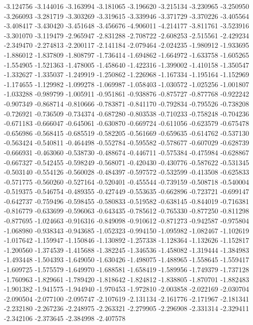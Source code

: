 -3.124756
-3.144016
-3.163994
-3.181065
-3.196620
-3.215134
-3.230965
-3.250950
-3.266093
-3.281719
-3.303269
-3.319615
-3.339946
-3.371729
-3.370226
-3.405564
-3.408417
-3.430420
-3.451648
-3.456676
-4.906011
-4.214177
-3.811761
-3.523916
-3.301070
-3.119479
-2.965947
-2.831288
-2.708722
-2.608253
-2.515561
-2.429234
-2.349470
-2.274813
-2.200117
-2.141184
-2.079464
-2.024235
-1.980912
-1.933695
-1.886012
-1.837809
-1.808797
-1.736414
-1.694862
-1.664972
-1.633758
-1.605265
-1.554905
-1.521363
-1.478005
-1.458640
-1.422316
-1.399002
-1.410158
-1.350547
-1.332627
-1.335037
-1.249919
-1.250862
-1.226968
-1.167334
-1.195164
-1.152969
-1.174655
-1.129982
-1.099278
-1.069987
-1.058403
-1.030572
-1.025256
-1.001807
-1.033288
-0.989799
-1.005911
-0.951861
-0.938876
-0.875727
-0.877768
-0.922242
-0.907349
-0.868714
-0.810666
-0.783871
-0.841170
-0.792834
-0.795526
-0.738208
-0.726921
-0.736509
-0.734374
-0.687280
-0.803538
-0.710233
-0.758248
-0.704236
-0.671183
-0.666047
-0.645061
-0.630870
-0.669724
-0.611056
-0.623579
-0.675478
-0.656986
-0.568415
-0.685519
-0.582205
-0.561669
-0.659635
-0.614762
-0.537130
-0.563424
-0.540811
-0.464498
-0.552784
-0.595582
-0.578677
-0.607029
-0.628739
-0.666931
-0.463060
-0.538730
-0.488674
-0.446711
-0.575384
-0.475984
-0.628867
-0.667327
-0.542455
-0.598249
-0.568071
-0.420430
-0.430776
-0.587622
-0.531345
-0.503140
-0.554126
-0.560028
-0.484397
-0.597572
-0.532599
-0.413508
-0.625833
-0.571775
-0.560260
-0.527164
-0.520401
-0.455544
-0.739159
-0.508718
-0.540004
-0.519375
-0.546754
-0.489355
-0.427449
-0.553635
-0.662896
-0.723721
-0.699147
-0.642737
-0.759496
-0.598455
-0.580833
-0.519582
-0.638145
-0.844019
-0.716381
-0.816779
-0.633699
-0.596063
-0.643435
-0.785612
-0.765330
-0.877250
-0.811298
-0.877695
-1.024663
-0.916316
-0.849098
-0.910612
-0.871273
-0.942587
-0.975804
-1.068980
-0.938343
-0.943685
-1.052323
-0.994150
-1.095982
-1.082467
-1.102619
-1.017642
-1.159947
-1.150846
-1.130892
-1.257338
-1.128364
-1.132626
-1.152817
-1.200560
-1.374539
-1.415688
-1.382245
-1.346536
-1.458082
-1.319444
-1.384983
-1.493448
-1.504393
-1.649050
-1.630426
-1.498075
-1.488965
-1.558645
-1.559417
-1.609725
-1.575579
-1.649970
-1.688581
-1.658419
-1.589956
-1.749379
-1.737128
-1.760963
-1.829661
-1.789420
-1.818642
-1.824812
-1.838805
-1.870701
-1.882483
-1.901382
-1.941575
-1.944940
-1.970453
-1.972810
-2.003858
-2.022169
-2.030704
-2.090504
-2.077100
-2.095747
-2.107619
-2.131134
-2.161776
-2.171967
-2.181341
-2.232180
-2.267236
-2.248975
-2.263321
-2.279905
-2.296908
-2.331314
-2.329411
-2.342106
-2.373645
-2.384998
-2.407578

